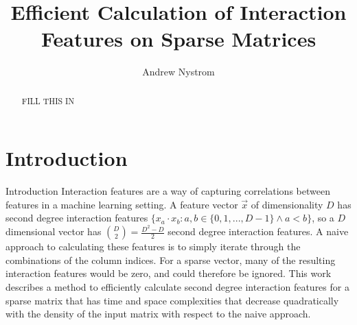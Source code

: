 \documentclass[11pt]{article}
\begin{document}
\title{Efficient Calculation of Interaction Features on Sparse Matrices}
\author{Andrew Nystrom}
\date{}

\maketitle

\begin{abstract}%
FILL THIS IN
\end{abstract}

\section{Introduction}

Introduction
Interaction features are a way of capturing correlations between features in a machine 
learning setting. A feature vector $\vec{x}$ of dimensionality $D$ has second degree interaction features 
$\{x_a \cdot x_b : a, b \in \{0,1,..., D-1\} \land a < b\}$, 
so a $D$ dimensional vector has $\binom{D}{2} = \frac{D^2-D}{2}$ second degree interaction features. A naive
approach to calculating these features is to simply iterate through the combinations of the column indices.
For a sparse vector, many of the resulting interaction features would be zero, and could therefore be ignored.
This work describes a method to efficiently calculate second degree interaction features for a sparse matrix 
that has time and space complexities that decrease quadratically with the density of the input matrix with respect to the naive approach.








\end{document}
